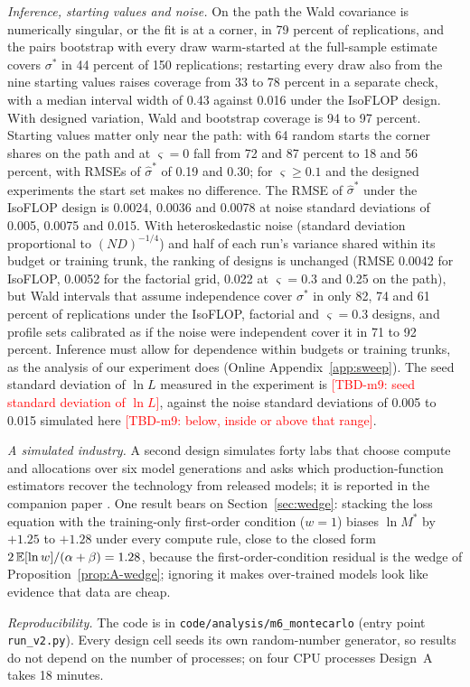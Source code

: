 \textit{Inference, starting values and noise.} On the path the Wald covariance is numerically singular, or the fit is at
a corner, in 79 percent of replications, and the pairs bootstrap with every draw warm-started at the full-sample estimate
covers $\sigma^*$ in 44 percent of 150 replications; restarting every draw also from the nine starting values raises coverage
from 33 to 78 percent in a separate check, with a median interval width of 0.43 against 0.016 under the IsoFLOP design.
With designed variation, Wald and bootstrap coverage is 94 to 97 percent. Starting values matter only near the path: with
64 random starts the corner shares on the path and at $\varsigma=0$ fall from 72 and 87 percent to 18 and 56 percent, with
RMSEs of $\hat\sigma^*$ of 0.19 and 0.30; for $\varsigma\ge0.1$ and the designed experiments the start set
makes no difference. The RMSE of $\hat\sigma^*$ under the IsoFLOP design is 0.0024, 0.0036 and 0.0078 at noise standard
deviations of 0.005, 0.0075 and 0.015. With heteroskedastic noise (standard deviation proportional to $(ND)^{-1/4}$) and
half of each run's variance shared within its budget or training trunk, the ranking of designs is unchanged (RMSE 0.0042
for IsoFLOP, 0.0052 for the factorial grid, 0.022 at $\varsigma=0.3$ and 0.25 on the path), but Wald intervals that assume
independence cover $\sigma^*$ in only 82, 74 and 61 percent of replications under the IsoFLOP, factorial and
$\varsigma=0.3$ designs, and profile sets calibrated as if the noise were independent cover it in 71 to 92 percent. Inference must allow for dependence within budgets or training trunks, as the analysis of our
experiment does (Online Appendix~\ref{app:sweep}). The seed standard deviation of $\ln L$ measured in the
experiment is \textcolor{red}{[TBD-m9: seed standard deviation of $\ln L$]}, against the noise standard deviations of
0.005 to 0.015 simulated here \textcolor{red}{[TBD-m9: below, inside or above that range]}.



\textit{A simulated industry.} A second design simulates forty labs that choose compute and allocations over six model
generations and asks which production-function estimators recover the technology from released models; it is reported
in the companion paper \citep{okar2026observational}. One result bears on Section~\ref{sec:wedge}: stacking the loss equation with the training-only
first-order condition ($w=1$) biases $\ln M^*$ by $+1.25$ to $+1.28$ under every compute rule, close to the closed form
$2\,\mathbb{E}[\ln w]/(\alpha+\beta)=1.28$, because the first-order-condition residual is the wedge of
Proposition~\ref{prop:A-wedge}; ignoring it makes over-trained models look like evidence that data are cheap.

\textit{Reproducibility.} The code is in \texttt{code/analysis/m6\_montecarlo} (entry point \texttt{run\_v2.py}). Every
design cell seeds its own random-number generator, so results do not depend on the number of processes; on four CPU
processes Design~A takes 18 minutes.
